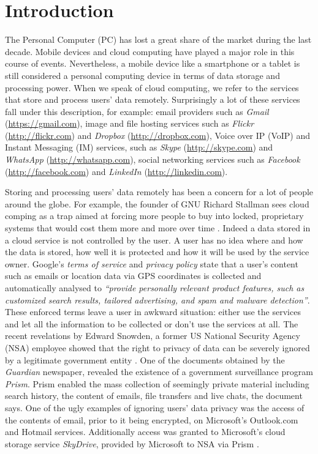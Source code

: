 \section{Introduction}

The Personal Computer (PC) has lost a great share of the market during the
last decade. Mobile devices and cloud computing have played a major role in
this course of events. Nevertheless, a mobile device like a smartphone or a
tablet is still considered a personal computing device in terms of data
storage and processing power. When we speak of cloud computing, we refer to
the services that store and process users' data remotely.
Surprisingly a lot of these services fall under this description,
for example: email providers such as
\emph{Gmail} (\url{https://gmail.com}),
image and file hosting services such as
\emph{Flickr} (\url{http://flickr.com}) and
\emph{Dropbox} (\url{http://dropbox.com}),
Voice over IP (VoIP) and Instant Messaging (IM) services, such as
\emph{Skype} (\url{http://skype.com}) and
\emph{WhatsApp} (\url{http://whatsapp.com}),
social networking services such as
\emph{Facebook} (\url{http://facebook.com}) and
\emph{LinkedIn} (\url{http://linkedin.com}).

Storing and processing users' data remotely has been a concern for
a lot of people around the globe. For example, the founder of GNU
Richard Stallman sees cloud comping as a trap aimed at forcing more
people to buy into locked, proprietary systems that would cost them
more and more over time \citep{stallman-cloud-08}.
Indeed a data stored in a cloud service is not controlled by the user.
A user has no idea where and how the data is stored, how well it is
protected and how it will be used by the service owner.
Google's \emph{terms of service} \citep{google-tos} and
\emph{privacy policy} \cite{google-privacy} state that a user's content
such as emails or location data via GPS coordinates is collected
and automatically analysed to
\emph{``provide personally relevant product
features, such as customized search results, tailored advertising,
and spam and malware detection''}.
These enforced terms leave a user
in awkward situation: either use the services and let all the information
to be collected or don't use the services at all.
The recent revelations
by Edward Snowden, a former US National Security Agency (NSA) employee
showed that the right to privacy of data can be severely ignored by a
legitimate government entity \citep{snowden-timeline}.
One of the documents obtained by the \emph{Guardian} newspaper,
revealed the existence of a government surveillance program
\emph{Prism}\cite{snowden-prism}.
Prism enabled the mass collection of seemingly private material
including search history, the content of emails, file
transfers and live chats, the document says. One of the ugly examples
of ignoring users' data privacy was the access of the contents of email,
prior to it being encrypted, on Microsoft's Outlook.com and Hotmail services.
Additionally access was granted to Microsoft's
cloud storage service \emph{SkyDrive}, provided by Microsoft to NSA
via Prism \citep{snowden-ms-nsa}.

